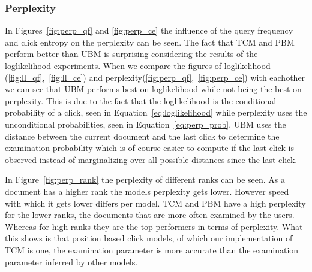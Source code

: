 \subsubsection{Perplexity}
In Figures~\ref{fig:perp_qf} and \ref{fig:perp_ce} the influence of the query frequency and click entropy on the perplexity can be seen. The fact that TCM and PBM perform better than UBM is surprising considering the results of the loglikelihood-experiments. When we compare the figures of loglikelihood (\ref{fig:ll_qf},~\ref{fig:ll_ce}) and perplexity(\ref{fig:perp_qf},~\ref{fig:perp_ce}) with eachother we can see that UBM performs best on loglikelihood while not being the best on perplexity. This is due to the fact that the loglikelihood is the conditional probability of a click, seen in Equation~\ref{eq:loglikelihood} while perplexity uses the unconditional probabilities, seen in Equation~\ref{eq:perp_prob}. UBM uses the distance between the current document and the last click to determine the examination probability which is of course easier to compute if the last click is observed instead of marginalizing over all possible distances since the last click.

In Figure~\ref{fig:perp_rank} the perplexity of different ranks can be seen. As a document has a higher rank the models perplexity gets lower. However speed with which it gets lower differs per model. TCM and PBM have a high perplexity for the lower ranks, the documents that are more often examined by the users. Whereas for high ranks they are the top performers in terms of perplexity. What this shows is that position based click models, of which our implementation of TCM is one, the examination parameter is more accurate than the examination parameter inferred by other models.


